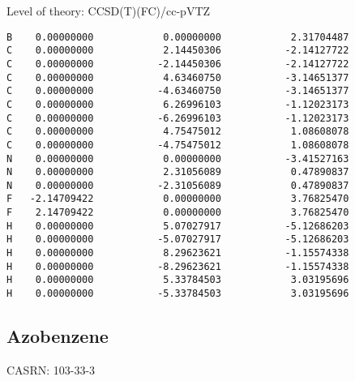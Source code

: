 \documentclass[journal=jctcce,manuscript=article,layout=traditional]{achemso}
\newcommand{\TZ}{cc-pVTZ}
\begin{document}
\begin{singlespace}
\noindent Level of theory: CCSD(T)(FC)/{\TZ}
\begin{verbatim}
B    0.00000000            0.00000000            2.31704487
C    0.00000000            2.14450306           -2.14127722
C    0.00000000           -2.14450306           -2.14127722
C    0.00000000            4.63460750           -3.14651377
C    0.00000000           -4.63460750           -3.14651377
C    0.00000000            6.26996103           -1.12023173
C    0.00000000           -6.26996103           -1.12023173
C    0.00000000            4.75475012            1.08608078
C    0.00000000           -4.75475012            1.08608078
N    0.00000000            0.00000000           -3.41527163
N    0.00000000            2.31056089            0.47890837
N    0.00000000           -2.31056089            0.47890837
F   -2.14709422            0.00000000            3.76825470
F    2.14709422            0.00000000            3.76825470
H    0.00000000            5.07027917           -5.12686203
H    0.00000000           -5.07027917           -5.12686203
H    0.00000000            8.29623621           -1.15574338
H    0.00000000           -8.29623621           -1.15574338
H    0.00000000            5.33784503            3.03195696
H    0.00000000           -5.33784503            3.03195696
\end{verbatim}
\end{singlespace}

\subsection{Azobenzene}

CASRN: 103-33-3
\end{document}
